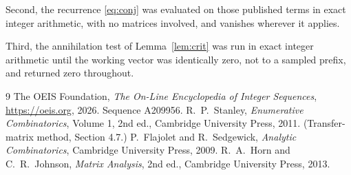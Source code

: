 \documentclass[11pt,a4paper]{article}
\theoremstyle{plain}
\theoremstyle{definition}
\begin{document}
Second, the recurrence \eqref{eq:conj} was evaluated on those published terms in exact
integer arithmetic, with no matrices involved, and vanishes wherever it applies.

Third, the annihilation test of Lemma~\ref{lem:crit} was run in exact integer arithmetic
until the working vector was identically zero, not to a sampled prefix, and returned zero
throughout.

\begin{thebibliography}{9}
 The OEIS Foundation, \emph{The On-Line Encyclopedia of Integer
Sequences}, \url{https://oeis.org}, 2026. Sequence A209956.
 R.~P.~Stanley, \emph{Enumerative Combinatorics}, Volume 1, 2nd ed.,
Cambridge University Press, 2011. (Transfer-matrix method, Section 4.7.)
 P.~Flajolet and R.~Sedgewick, \emph{Analytic Combinatorics}, Cambridge
University Press, 2009.
 R.~A.~Horn and C.~R.~Johnson, \emph{Matrix Analysis}, 2nd ed., Cambridge
University Press, 2013.
\end{thebibliography}
\end{document}
